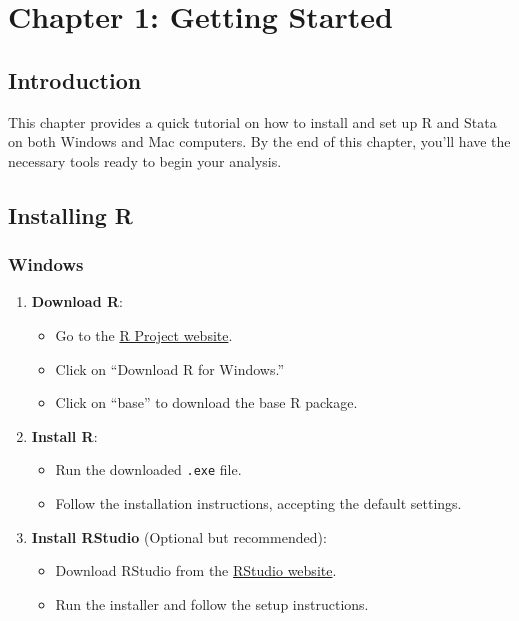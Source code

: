 \documentclass[
  letterpaper,
  DIV=11,
  numbers=noendperiod]{scrreprt}
\providecommand{\tightlist}{%
  \setlength{\itemsep}{0pt}\setlength{\parskip}{0pt}}\usepackage{longtable,booktabs,array}
\begin{document}

\chapter{Chapter 1: Getting Started}\label{chapter-1-getting-started}

\section{Introduction}\label{introduction}

This chapter provides a quick tutorial on how to install and set up R
and Stata on both Windows and Mac computers. By the end of this chapter,
you'll have the necessary tools ready to begin your analysis.

\section{Installing R}\label{installing-r}

\subsection{Windows}\label{windows}

\begin{enumerate}
\def\labelenumi{\arabic{enumi}.}
\tightlist
\item
  \textbf{Download R}:

  \begin{itemize}
  \tightlist
  \item
    Go to the \href{https://cran.r-project.org/}{R Project website}.
  \item
    Click on ``Download R for Windows.''
  \item
    Click on ``base'' to download the base R package.
  \end{itemize}
\item
  \textbf{Install R}:

  \begin{itemize}
  \tightlist
  \item
    Run the downloaded \texttt{.exe} file.
  \item
    Follow the installation instructions, accepting the default
    settings.
  \end{itemize}
\item
  \textbf{Install RStudio} (Optional but recommended):

  \begin{itemize}
  \tightlist
  \item
    Download RStudio from the
    \href{https://rstudio.com/products/rstudio/download/}{RStudio
    website}.
  \item
    Run the installer and follow the setup instructions.
  \end{itemize}
\end{enumerate}
\end{document}
